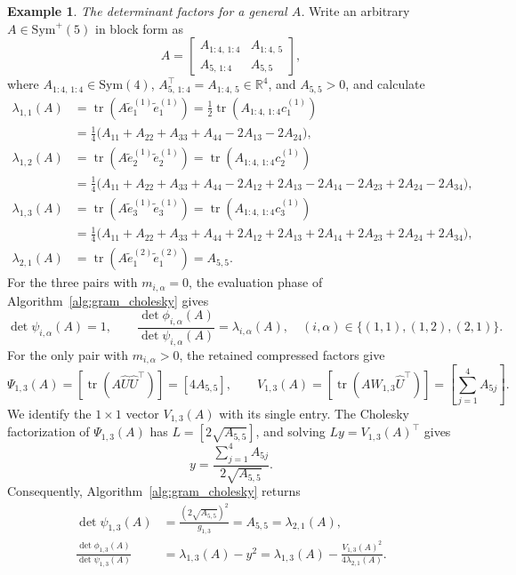 \documentclass[12pt]{amsart}
\theoremstyle{plain}
\theoremstyle{definition}
\newtheorem{example}[theorem]{Example}
\theoremstyle{remark}
\newcommand{\R}{\mathbb{R}}
\newcommand{\1}{\mathbf{1}}
\newcommand{\tr}{\operatorname{tr}}
\begin{document}
\begin{example}
\noindent\emph{The determinant factors for a general $A$.}
Write an arbitrary $A\in\mathrm{Sym}^+(5)$ in block form as
\[
A=
\begin{bmatrix}
A_{1:4,\,1:4}&A_{1:4,\,5}\\
A_{5,\,1:4}&A_{5,5}
\end{bmatrix},
\]
where $A_{1:4,\,1:4}\in\mathrm{Sym}(4)$, $A_{5,\,1:4}^\top = A_{1:4,\,5}\in\R^4$, and $A_{5,5}>0$,
and calculate
\[
\begin{aligned}
\lambda_{1,1}(A)
&=\tr\!\left(A\tilde e_1^{(1)}\tilde e_1^{(1)}\right)
=\frac12\tr(A_{1:4,\,1:4}c_1^{(1)})\\
&=\frac14\bigl(A_{11}+A_{22}+A_{33}+A_{44}-2A_{13}-2A_{24}\bigr),\\[1mm]
\lambda_{1,2}(A)
&=\tr\!\left(A\tilde e_2^{(1)}\tilde e_2^{(1)}\right)
=\tr(A_{1:4,\,1:4}c_2^{(1)})\\
&=\frac14\bigl(A_{11}+A_{22}+A_{33}+A_{44}
-2A_{12}+2A_{13}-2A_{14}-2A_{23}+2A_{24}-2A_{34}\bigr),\\[1mm]
\lambda_{1,3}(A)
&=\tr\!\left(A\tilde e_3^{(1)}\tilde e_3^{(1)}\right)
=\tr(A_{1:4,\,1:4}c_3^{(1)})\\
&=\frac14\bigl(A_{11}+A_{22}+A_{33}+A_{44}
+2A_{12}+2A_{13}+2A_{14}+2A_{23}+2A_{24}+2A_{34}\bigr),\\[1mm]
\lambda_{2,1}(A)
&=\tr\!\left(A\tilde e_1^{(2)}\tilde e_1^{(2)}\right)
=A_{5,5}.
\end{aligned}
\]
For the three pairs with $m_{i,\alpha}=0$, the evaluation phase of
Algorithm~\ref{alg:gram_cholesky} gives
\[
\det\psi_{i,\alpha}(A)=1,
\qquad
\frac{\det\phi_{i,\alpha}(A)}{\det\psi_{i,\alpha}(A)}
=\lambda_{i,\alpha}(A),
\quad
(i,\alpha)\in\{(1,1),(1,2),(2,1)\}.
\]
For the only pair with $m_{i,\alpha}>0$, the retained compressed factors
give
\[
\Psi_{1,3}(A)
=[\tr(A\widehat U\widehat U^\top)]
=[4A_{5,5}],
\qquad
V_{1,3}(A)
=[\tr(AW_{1,3}\widehat U^\top)]
=\left[\sum_{j=1}^4 A_{5j}\right].
\]
We identify the $1\times1$ vector $V_{1,3}(A)$ with its single entry.
The Cholesky factorization of $\Psi_{1,3}(A)$ has
$L=[2\sqrt{A_{5,5}}]$, and solving
$Ly=V_{1,3}(A)^\top$ gives
\[
 y=\frac{\sum_{j=1}^4 A_{5j}}{2\sqrt{A_{5,5}}}.
\]
Consequently, Algorithm~\ref{alg:gram_cholesky} returns
\begin{align*}
\det\psi_{1,3}(A)
&=\frac{(2\sqrt{A_{5,5}})^2}{g_{1,3}}
=A_{5,5}=\lambda_{2,1}(A),\\
\frac{\det\phi_{1,3}(A)}{\det\psi_{1,3}(A)}
&=\lambda_{1,3}(A)-y^2
=\lambda_{1,3}(A)
-\frac{V_{1,3}(A)^2}{4\lambda_{2,1}(A)}.
\end{align*}



\end{example}
\end{document}
